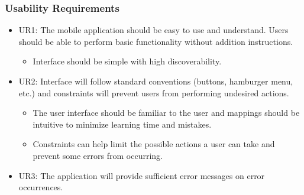 \documentclass[]{article}
\begin{document}
\subsubsection{Usability Requirements}
\begin{itemize}
	\item UR1: The mobile application should be easy to use and understand. Users should be able to perform basic functionality without addition instructions.
	\begin{itemize}
		\item Interface should be simple with high discoverability.
	\end{itemize}
	\item UR2: Interface will follow standard conventions (buttons, hamburger menu, etc.) and constraints will prevent users from performing undesired actions.
	\begin{itemize}
		\item The user interface should be familiar to the user and mappings should be intuitive to minimize learning time and mistakes.
		\item Constraints can help limit the possible actions a user can take and prevent some errors from occurring.
	\end{itemize}
	\item UR3: The application will provide sufficient error messages on error occurrences.
\end{itemize}
\end{document}
